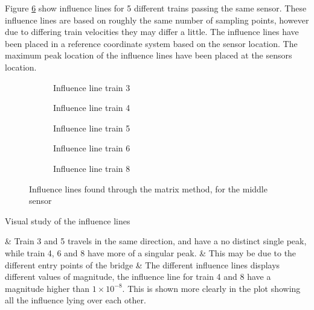 Figure \ref{fig:Influence_lines} show influence lines for 5 different trains passing the same sensor. These influence lines are based on roughly the same number of sampling points, however due to differing train velocities they may differ a little. The influence lines have been placed in a reference coordinate system based on the sensor location. The maximum peak location of the influence lines have been placed at the sensors location.
	\begin{figure}[H]
		\begin{subfigure}[t]{0.4\textwidth}
			
			\caption{Influence line train 3}
			\label{fig:train3}
		\end{subfigure}
		\qquad
		\begin{subfigure}[t]{0.4\textwidth}
			
			\caption{Influence line train 4}
			\label{fig:train4}
		\end{subfigure}
		\begin{subfigure}[t]{0.4\textwidth}
			\centering
			
			\caption{Influence line train 5}
			\label{fig:train5}
		\end{subfigure}
		\qquad
		\begin{subfigure}[t]{0.4\textwidth}
			\centering
			
			\caption{Influence line train 6}
			\label{fig:train6}
		\end{subfigure}
		\begin{subfigure}[t]{0.9\textwidth}
			\centering
			
			\caption{Influence line train 8}
			\label{fig:train8}
		\end{subfigure}
		\caption{Influence lines found through the matrix method, for the middle sensor}
		\label{fig:Influence_lines}
	\end{figure}
Visual study of the influence lines
\begin{easylist}[itemize]
	& Train 3 and 5 travels in the same direction, and have a no distinct single peak, while train 4, 6 and 8 have more of a singular peak.
	& This may be due to the different entry points of the bridge
	& The different influence lines displays different values of magnitude, the influence line for train 4 and 8 have a magnitude higher than $ 1 \times 10^{-8} $. This is shown more clearly in the plot showing all the influence lying over each other.
\end{easylist}


